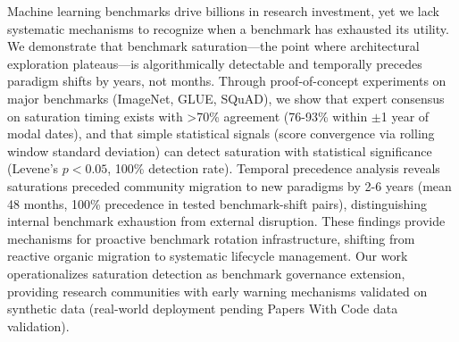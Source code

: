 Machine learning benchmarks drive billions in research investment, yet we lack systematic mechanisms to recognize when a benchmark has exhausted its utility. We demonstrate that benchmark saturation---the point where architectural exploration plateaus---is algorithmically detectable and temporally precedes paradigm shifts by years, not months. Through proof-of-concept experiments on major benchmarks (ImageNet, GLUE, SQuAD), we show that expert consensus on saturation timing exists with >70\% agreement (76-93\% within $\pm$1 year of modal dates), and that simple statistical signals (score convergence via rolling window standard deviation) can detect saturation with statistical significance (Levene's $p<0.05$, 100\% detection rate). Temporal precedence analysis reveals saturations preceded community migration to new paradigms by 2-6 years (mean 48 months, 100\% precedence in tested benchmark-shift pairs), distinguishing internal benchmark exhaustion from external disruption. These findings provide mechanisms for proactive benchmark rotation infrastructure, shifting from reactive organic migration to systematic lifecycle management. Our work operationalizes saturation detection as benchmark governance extension, providing research communities with early warning mechanisms validated on synthetic data (real-world deployment pending Papers With Code data validation).

